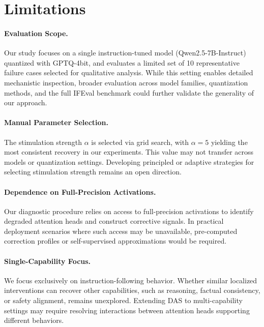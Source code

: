 \documentclass[11pt]{article}
\begin{document}







\section{Limitations}

\paragraph{Evaluation Scope.}
Our study focuses on a single instruction-tuned model (Qwen2.5-7B-Instruct) quantized
with GPTQ-4bit, and evaluates a limited set of 10 representative failure cases
selected for qualitative analysis.
While this setting enables detailed mechanistic inspection, broader evaluation
across model families, quantization methods, and the full IFEval benchmark 
could further validate the generality of our approach.

\paragraph{Manual Parameter Selection.}
The stimulation strength $\alpha$ is selected via grid search, with
$\alpha=5$ yielding the most consistent recovery in our experiments.
This value may not transfer across models or quantization settings.
Developing principled or adaptive strategies for selecting stimulation strength
remains an open direction.

\paragraph{Dependence on Full-Precision Activations.}
Our diagnostic procedure relies on access to full-precision activations to
identify degraded attention heads and construct corrective signals.
In practical deployment scenarios where such access may be unavailable,
pre-computed correction profiles or self-supervised approximations would be
required.

\paragraph{Single-Capability Focus.}
We focus exclusively on instruction-following behavior.
Whether similar localized interventions can recover other capabilities, such as
reasoning, factual consistency, or safety alignment, remains unexplored.
Extending DAS to multi-capability settings may require resolving interactions
between attention heads supporting different behaviors.






\end{document}
